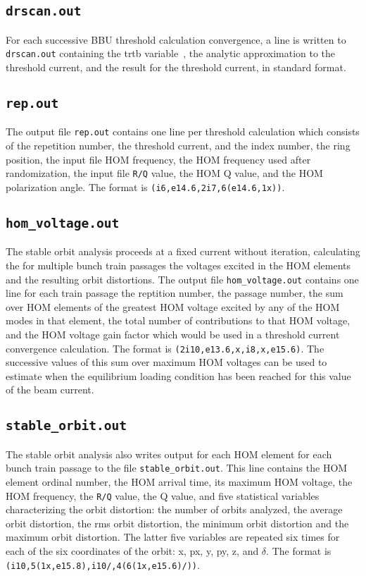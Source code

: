 \documentclass[11pt]{article}
\begin{document}
{\subsection{{\tt drscan.out}}
For each successive BBU threshold calculation convergence, a line is written
to {\tt drscan.out} containing the {tr\/tb} variable~\cite{ref:Hoffstaetter04},
the analytic approximation to the threshold current, and the result for the
threshold current, in standard format.
\subsection{{\tt rep.out}}
The output file {\tt rep.out} contains one line per threshold calculation which
consists of the repetition number, the threshold current, and the index number, the 
ring position, the input file HOM frequency, the HOM frequency used after randomization,
the input file {\tt R/Q} value, the HOM Q value, and the HOM polarization angle.
The format is {\tt (i6,e14.6,2i7,6(e14.6,1x))}.
\subsection{{\tt hom_voltage.out}}
The stable orbit analysis proceeds at a fixed current without iteration, calculating
the for multiple bunch train passages the voltages excited in the HOM elements and
the resulting orbit distortions. The output file {\tt hom_voltage.out} contains one
line for each train passage the reptition number, the passage number, the sum over HOM
elements of the greatest HOM voltage excited by any of the HOM modes in that element,
the total number of contributions to that HOM voltage, and the HOM voltage gain factor which
would be used in a threshold current convergence calculation.
The format is {\tt (2i10,e13.6,x,i8,x,e15.6)}. The successive values of this sum over
maximum HOM voltages can be used to estimate when the equilibrium loading condition has
been reached for this value of the beam current.
\subsection{{\tt stable_orbit.out}}
The stable orbit analysis also writes output for each HOM element for each bunch train passage to
the file {\tt stable_orbit.out}. This line contains the HOM element ordinal number, the HOM
arrival time, its maximum HOM voltage, the HOM frequency, the {\tt R/Q} value, the Q value, and five
statistical variables characterizing the orbit distortion: the number of orbits analyzed, the average orbit distortion, the rms orbit distortion, the minimum orbit distortion and the maximum orbit distortion. The latter five variables are repeated six times for each of the six coordinates of the orbit: x, px, y, py, z, and ${\delta}$. The format is {\tt (i10,5(1x,e15.8),i10/,4(6(1x,e15.6)/))}.
}
\end{document}
